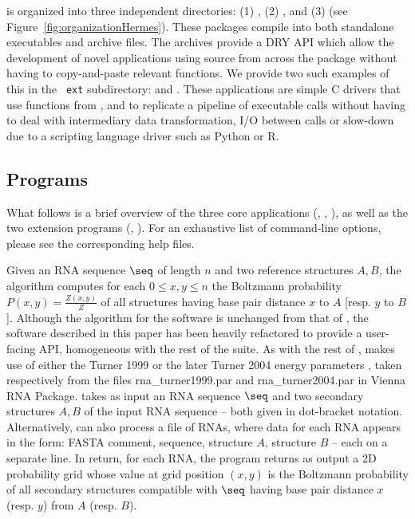 \hermes is organized into three independent directories: (1)
\ffttwo, (2) \rnamfpt, and (3) \rnaeq (see
Figure~\ref{fig:organizationHermes}). These packages compile into both
standalone executables and archive files. The archives provide a DRY
API which allow the development of novel applications using source
from across the \hermes package without having to copy-and-paste
relevant functions. We provide two such examples of this in the {\tt
ext} subdirectory: \fftmfpt and \ffteq. These applications
are simple C drivers that use functions from \ffttwo, \rnamfpt and
\rnaeq to replicate a pipeline of executable calls without having to
deal with intermediary data transformation, I/O between calls or
slow-down due to a scripting language driver such as Python or R.

\subsection{Programs}

What follows is a brief overview of the three core applications
(\ffttwo, \rnamfpt, \rnaeq), as well as the two extension
programs (\fftmfpt, \ffteq). For an exhaustive list of
command-line options, please see the corresponding help files.

Given an RNA sequence $\seq$ of length $n$ and two reference
structures $A,B$, the algorithm \ffttwo \cite{Senter.jmb14}
computes for each $0 \leq x,y \leq n$ the Boltzmann probability
$P(x,y) = \frac{Z(x,y)}{Z}$ of all structures having base pair
distance $x$ to $A$ [resp. $y$ to $B$]. Although the algorithm for the
software \ffttwo is unchanged from that of \cite{Senter.jmb14},
the software described in this
paper has been heavily refactored to provide a user-facing API,
homogeneous with the rest of the \hermes suite. As with the rest of
\hermes, \ffttwo makes use of either the Turner 1999 \cite{turner}
or the later Turner 2004 energy parameters
\cite{Turner.nar10}, taken respectively
from the files rna\_turner1999.par and  rna\_turner2004.par in Vienna
RNA Package. \ffttwo takes as input an RNA sequence $\seq$ and two
secondary structures $A,B$ of the input RNA sequence -- both given
in dot-bracket
notation. Alternatively, \ffttwo can also process a file of RNAs,
where data for each RNA appears in the form: FASTA comment, sequence,
structure $A$, structure $B$ -- each on a separate line. In return,
for each RNA, the program returns as output a 2D probability grid
whose value at
grid position $(x,y)$ is the Boltzmann probability of all secondary
structures compatible with $\seq$ having base pair distance $x$ (resp.
$y$) from $A$ (resp. $B$).

